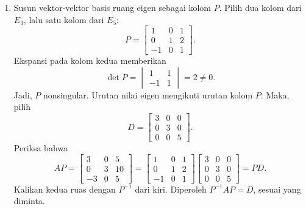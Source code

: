 \documentclass[11pt,a4paper]{article}
\begin{document}
\begin{enumerate}[itemsep=12pt,parsep=5pt]
\begin{enumerate}
          \item Susun vektor-vektor basis ruang eigen sebagai kolom $P$.
                Pilih dua kolom dari $E_3$, lalu satu kolom dari $E_5$:
                \[
                  P=\begin{bmatrix}1&0&1\\0&1&2\\-1&0&1\end{bmatrix}.
                \]
                Ekspansi pada kolom kedua memberikan
                \[
                  \det P=\begin{vmatrix}1&1\\-1&1\end{vmatrix}=2\ne0.
                \]
                Jadi, $P$ nonsingular.
                Urutan nilai eigen mengikuti urutan kolom $P$.
                Maka, pilih
                \[
                  D=\begin{bmatrix}3&0&0\\0&3&0\\0&0&5\end{bmatrix}.
                \]
                Periksa bahwa
                \[
                  AP=\begin{bmatrix}3&0&5\\0&3&10\\-3&0&5\end{bmatrix}
                  =\begin{bmatrix}1&0&1\\0&1&2\\-1&0&1\end{bmatrix}
                  \begin{bmatrix}3&0&0\\0&3&0\\0&0&5\end{bmatrix}
                  =PD.
                \]
                Kalikan kedua ruas dengan $P^{-1}$ dari kiri.
                Diperoleh $P^{-1}AP=D$, sesuai yang diminta.
        \end{enumerate}
\end{enumerate}
\end{document}

